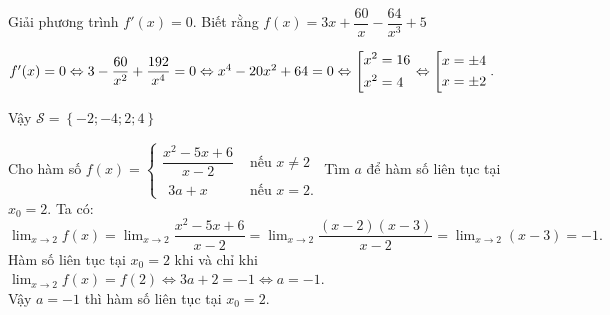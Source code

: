 \begin{bt}
\begin{bt}
{		
		
	}
\end{bt}
\begin{bt}%
	Giải phương trình $ f'(x) = 0. $ Biết rằng $ f(x) = 3x + \dfrac{60}{x} - \dfrac{64}{x^3} +5$

	\loigiai
	{  	$
		f'(x) = 0
		 \Leftrightarrow 3 - \dfrac{60}{x^2} + \dfrac{192}{x^4} = 0 
		\Leftrightarrow x^4 - 20x^2 + 64 = 0
		 \Leftrightarrow \left[\begin{aligned}&x^2=16\\&x^2 = 4\end{aligned}\right.
		\Leftrightarrow\left[\begin{aligned}&x=  \pm 4 \\&x = \pm 2\end{aligned}\right..
		$
	
		
		
		Vậy $ \mathcal{S} = \left\{ { - 2; - 4;2;4} \right\} $
	}
\end{bt}
\end{bt}

\begin{bt}%
	Cho hàm số $f(x)=\begin{cases}
\dfrac{x^2 - 5x +6}{x-2} & \text{ nếu } x \ne 2\\
\ \ 3a + x & \text{ nếu } x=2.
\end{cases}$
	Tìm $ a $ để hàm số liên tục tại $ x _0 = 2$.
	\loigiai
	{Ta có: 
		$\displaystyle\lim_{x\to 2}f(x)
		=\displaystyle\lim_{x\to2}\dfrac{x^2 - 5x + 6}{x-2} 
		 =\displaystyle\lim_{x\to2}\dfrac{(x-2)(x-3)}{x-2} 
		=\displaystyle\lim_{x\to 2}(x-3)
		=-1.	$\\
		Hàm số liên tục tại $ x_0 = 2 $ khi và chỉ khi $ \displaystyle\lim_{x\to2}f(x) = f(2) \Leftrightarrow 3a + 2 = -1 \Leftrightarrow a = -1 $.\\
		Vậy $ a = -1 $ thì hàm số liên tục tại $ x_ 0 = 2 $.
	}
\end{bt}

